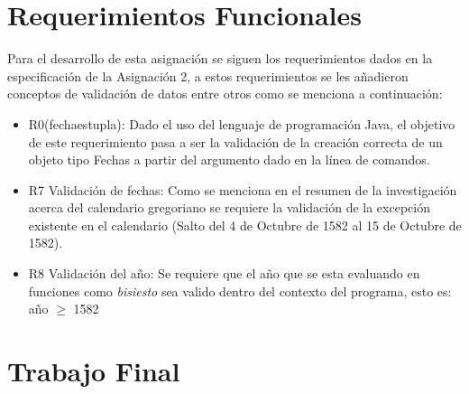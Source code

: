 \documentclass[10pt,journal,compsoc]{IEEEtran}
\begin{document}
	\section{Requerimientos Funcionales}
	\par Para el desarrollo de esta asignación se siguen los requerimientos dados en la especificación de la Asignación 2, a estos requerimientos se les añadieron conceptos de validación de datos entre otros como se menciona a continuación:
	\begin{itemize}
		\item R0(fecha\textunderscore es\textunderscore tupla): Dado el uso del lenguaje de programación Java, el objetivo de este requerimiento pasa a ser la validación de la creación correcta de un objeto tipo Fechas a partir del argumento dado en la línea de comandos.
		\item R7 Validación de fechas: Como se menciona en el resumen de la investigación acerca del calendario gregoriano se requiere la validación de la excepción existente en el calendario (Salto del 4 de Octubre de 1582 al 15 de Octubre de 1582).
		\item R8 Validación del año: Se requiere que el año que se esta evaluando en funciones como \textit{bisiesto} sea valido dentro del contexto del programa, esto es: año $\geq$ 1582
	\end{itemize}  

\section{Trabajo Final}
\end{document}
